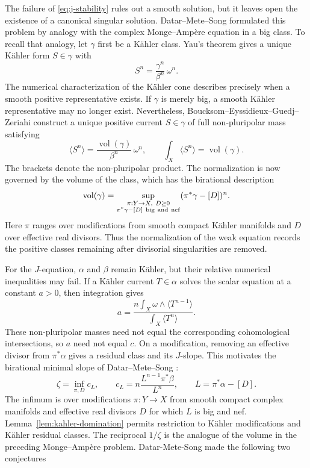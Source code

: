 \documentclass[reqno]{amsart}
\numberwithin{equation}{section}
\theoremstyle{definition}
\DeclareMathOperator{\vol}{vol}
\begin{document}
The failure of \eqref{eq:j-stability} rules
out a smooth solution, but it leaves open the existence of a
canonical singular solution. Datar--Mete--Song \cite[Sections~1.1
and~1.2]{DMS26} formulated this problem by analogy with the complex
Monge--Amp\`ere equation in a big class. To recall that analogy,
let $\gamma$ first be a K\"ahler class. Yau's theorem \cite{Y78}
gives a unique K\"ahler form $S\in\gamma$ with
\[
 S^n=\frac{\gamma^n}{\beta^n}\,\omega^n.
\]
The numerical characterization of the K\"ahler cone
\cite{DP04} describes precisely when a smooth positive
representative exists. If $\gamma$ is merely big, a smooth
K\"ahler representative may no longer exist. Nevertheless,
Boucksom--Eyssidieux--Guedj--Zeriahi \cite{BEGZ10} construct a
unique positive current $S\in\gamma$ of full non-pluripolar mass satisfying
\[
 \langle S^n\rangle
 =\frac{\vol(\gamma)}{\beta^n}\,\omega^n,\qquad
 \int_X\langle S^n\rangle=\vol(\gamma).
\]
The brackets denote the non-pluripolar product.
The normalization is now governed by the volume of the class,
which has the birational description \cite{B02}
\[
 \vol(\gamma)
 =\sup_{\substack{\pi:Y\to X,\ D\ge0\\
                  \pi^*\gamma-[D]\ {\rm big\ and\ nef}}}
          (\pi^*\gamma-[D])^n.
\]
Here $\pi$ ranges over modifications from smooth compact
K\"ahler manifolds and $D$ over effective real divisors.
Thus the normalization of the weak equation records the positive
classes remaining after divisorial singularities are removed.

For the $J$-equation, $\alpha$ and $\beta$ remain K\"ahler,
but their relative numerical inequalities may fail. If a K\"ahler
current $T\in\alpha$ solves the scalar equation at a constant
$a>0$, then integration gives
\[
 a=\frac{n\int_X\omega\wedge\langle T^{n-1}\rangle}
          {\int_X\langle T^n\rangle}.
\]
These non-pluripolar masses need not equal the corresponding
cohomological intersections, so $a$ need not equal $c$.
On a modification, removing an effective divisor from
$\pi^*\alpha$ gives a residual class and its $J$-slope.
This motivates the birational minimal slope of
Datar--Mete--Song \cite[Definition~1.3]{DMS26}:
\begin{equation}\label{eq:minimal-slope}
 \zeta=\inf_{\pi,D}c_L,\qquad
 c_L=n\frac{L^{n-1}\pi^*\beta}{L^n},\qquad
 L=\pi^*\alpha-[D].
\end{equation}
The infimum is over modifications $\pi:Y\to X$ from smooth
compact complex manifolds and effective real divisors $D$ for
which $L$ is big and nef. Lemma~\ref{lem:kahler-domination}
permits restriction to K\"ahler modifications and K\"ahler
residual classes. The reciprocal $1/\zeta$ is the analogue
of the volume in the preceding Monge--Amp\`ere problem.
Datar-Mete-Song made the following two conjectures \cite{DMS26}
\end{document}
